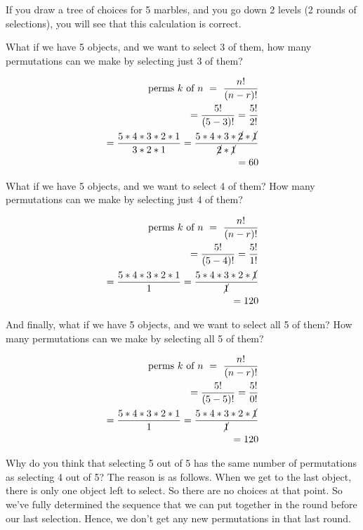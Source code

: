 \documentclass[../../../main.tex]{subfiles}
\begin{document}
\noindent
If you draw a tree of choices for 5 marbles, and you go down 2 levels (2 rounds of selections), you will see that this calculation is correct.

What if we have 5 objects, and we want to select 3 of them, how many permutations can we make by selecting just 3 of them?

\begin{align*}
  \text{perms $k$ of $n$}~=~\frac{n!}{(n - r)!} \\
  = \frac{5!}{(5 - 3)!} = \frac{5!}{2!} \\
  = \frac{5 * 4 * 3 * 2 * 1}{3 * 2 * 1} = \frac{5 * 4 * 3 * \cancel{2} * \cancel{1}}{\cancel{2} * \cancel{1}} \\
  = 60
\end{align*}

\noindent
What if we have 5 objects, and we want to select 4 of them? How many permutations can we make by selecting just 4 of them?

\begin{align*}
  \text{perms $k$ of $n$}~=~\frac{n!}{(n - r)!} \\
  = \frac{5!}{(5 - 4)!} = \frac{5!}{1!} \\
  = \frac{5 * 4 * 3 * 2 * 1}{1} = \frac{5 * 4 * 3 * 2 * \cancel{1}}{\cancel{1}} \\
  = 120
\end{align*}

\noindent
And finally, what if we have 5 objects, and we want to select all 5 of them? How many permutations can we make by selecting all 5 of them?

\begin{align*}
  \text{perms $k$ of $n$}~=~\frac{n!}{(n - r)!} \\
  = \frac{5!}{(5 - 5)!} = \frac{5!}{0!} \\
  = \frac{5 * 4 * 3 * 2 * 1}{1} = \frac{5 * 4 * 3 * 2 * \cancel{1}}{\cancel{1}} \\
  = 120
\end{align*}

\noindent
Why do you think that selecting 5 out of 5 has the same number of permutations as selecting 4 out of 5? The reason is as follows. When we get to the last object, there is only one object left to select. So there are no choices at that point. So we've fully determined the sequence that we can put together in the round before our last selection. Hence, we don't get any new permutations in that last round.


\end{document}
